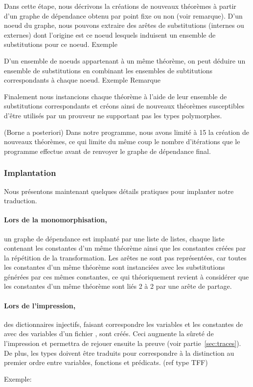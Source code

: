 Dans cette étape, nous décrivons la créations de nouveaux théorèmes à partir d'un graphe de dépendance obtenu par point fixe ou non (voir remarque). 
D'un noeud du graphe, nous pouvons extraire des arêtes de substitutions (internes ou externes) dont l'origine est ce noeud lesquels induisent un ensemble de substitutions pour ce noeud.
Exemple

D'un ensemble de noeuds appartenant à un même théorème, on peut déduire un ensemble de substitutions en combinant les ensembles de subtitutions correspondants à chaque noeud.
Exemple
Remarque

Finalement nous instancions chaque théorème à l'aide de leur ensemble de substitutions correspondants et créons ainsi de nouveaux théorèmes susceptibles d'être utilisés par un prouveur ne supportant pas les types polymorphes.



\begin{remark} (Borne a posteriori)
Dans notre programme, nous avons limité à 15 la création de nouveaux théorèmes, ce qui limite du même coup le nombre d'itérations que le programme effectue avant de renvoyer le graphe de dépendance final.
\end{remark}


\subsubsection{Implantation}
\label{sec:traduction:nouveautes:implantation}

Nous présentons maintenant quelques détails pratiques pour implanter notre traduction.

\paragraph{Lors de la monomorphisation,} un graphe de dépendance est
implanté par une liste de listes, chaque liste contenant les constantes
d'un même théorème ainsi que les constantes créées par la répétition de
la transformation. Les arêtes ne sont pas représentées, car toutes les
constantes d'un même théorème sont instanciées avec les substitutions
générées par ces mêmes constantes, ce qui théoriquement revient à
considérer que les constantes d'un même théorème sont liés 2 à 2 par une
arête de partage.

\paragraph{Lors de l'impression,} des dictionnaires injectifs, faisant
correspondre les variables et les constantes de \holfour avec des
variables d'un fichier \tff, sont créés. Ceci augmente la sûreté de
l'impression et permettra de rejouer ensuite la preuve (voir
partie~\ref{sec:traces}). De plus, les types doivent être traduits pour
correspondre à la distinction au premier ordre entre variables,
fonctions et prédicats. (\todo ref type TFF)

\todo Exemple:

